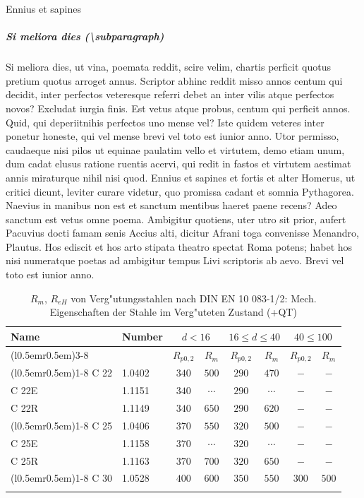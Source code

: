 \documentclass[nochapterpage,bigchapter,linedtoc,longdoc,colorback,accentcolor=tud4c]{tudreport}
\begin{document}
    Ennius et sapines 
  \subparagraph{Si meliora dies (\textbackslash subparagraph)}
    Si meliora dies, ut vina, poemata reddit, scire velim, chartis perficit quotus pretium quotus arroget annus. Scriptor abhinc reddit misso annos centum qui decidit, inter perfectos veteresque referri debet an inter vilis atque perfectos novos? Excludat iurgia finis. Est vetus atque probus, centum qui perficit annos. Quid, qui deperiitnihis perfectos uno mense vel? Iste quidem veteres inter ponetur honeste, qui vel mense brevi vel toto est iunior anno. Utor permisso, caudaeque nisi pilos ut equinae paulatim vello et virtutem, demo etiam unum, dum cadat elusus ratione ruentis acervi, qui redit in fastos et virtutem aestimat annis miraturque nihil nisi quod. Ennius et sapines et fortis et alter Homerus, ut critici dicunt, leviter curare videtur, quo promissa cadant et somnia Pythagorea.  Naevius in manibus non est et sanctum mentibus haeret paene recens?  Adeo sanctum est vetus omne poema. Ambigitur quotiens, uter utro sit prior, aufert Pacuvius docti famam senis Accius alti, dicitur Afrani toga convenisse Menandro, Plautus. Hos ediscit et hos arto stipata theatro spectat Roma potens; habet hos nisi numeratque poetas ad ambigitur tempus Livi scriptoris ab aevo. Brevi vel toto est iunior anno.

    \begin{center}
      \begin{longtable}[h!]
        {ll@{\kern5em}c@{\kern1.1em}c@{\kern1.1em}
        c@{\kern1.1em}c@{\kern1.1em}c@{\kern1.1em}c}
        \toprule
        \multirow{2}{*}{Name}&\multirow{2}{*}{Number}
        &\multicolumn{2}{c}{$d < 16$}&\multicolumn{2}{c}{$16 \leq d \leq 40$}&
        \multicolumn{2}{c}{$40 \leq 100$}\\\cmidrule(l{0.5em}r{0.5em}){3-8}
        & &$R_{p0,2}$ &$R_m$ &$R_{p0,2}$ &$R_m$ &$R_{p0,2}$ &$R_m$\\
        \cmidrule(l{0.5em}r{0.5em}){1-8}
        \endhead
        C 22 &1.0402 &$340$ &$500$ &$290$ &$470$ &$-$ &$-$\\
        C 22E &1.1151 &$340$ &$\cdots$ &$290$ &$\cdots$ &$-$ &$-$\\
        C 22R &1.1149 &$340$ &$650$ &$290$ &$620$ &$-$ &$-$\\
        \cmidrule(l{0.5em}r{0.5em}){1-8}
        C 25 &1.0406 &$370$ &$550$ &$320$ &$500$ &$-$ &$-$\\
        C 25E &1.1158 &$370$ &$\cdots$ &$320$ &$\cdots$ &$-$ &$-$\\
        C 25R &1.1163 &$370$ &$700$ &$320$ &$650$ &$-$ &$-$\\
        \cmidrule(l{0.5em}r{0.5em}){1-8}
        C 30 &1.0528 &$400$ &$600$ &$350$ &$550$ &$300$ &$500$\\
        \bottomrule
        \caption{$R_m$, $R_{eH}$ von Verg"utungsstahlen nach DIN EN 10 083-1/2: Mech.
          Eigenschaften der Stahle im Verg"uteten Zustand (+QT)}
      \end{longtable}
    \end{center}
\end{document}
